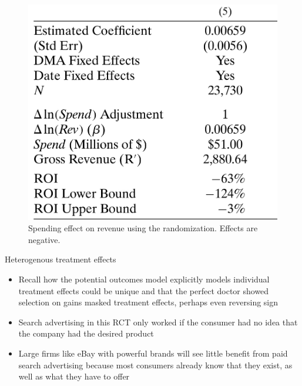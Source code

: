 \documentclass{beamer}
\begin{document}
\begin{frame}

\begin{figure}
\begin{center}
\includegraphics[scale=0.2]{./lecture_includes/tadelis_ols2.png}
\caption{Spending effect on revenue using the randomization. Effects are negative. }
\end{center}
\end{figure}

\end{frame}

\begin{frame}{Heterogenous treatment effects}

\begin{itemize}
\item Recall how the potential outcomes model explicitly models individual treatment effects could be unique and that the perfect doctor showed selection on gains masked treatment effects, perhaps even reversing sign
\item Search advertising in this RCT only worked if the consumer had no idea that the company had the desired product
\item Large firms like eBay with powerful brands will see little benefit from paid search advertising because most consumers already know that they exist, as well as what they have to offer
\end{itemize}

\end{frame}
\end{document}
